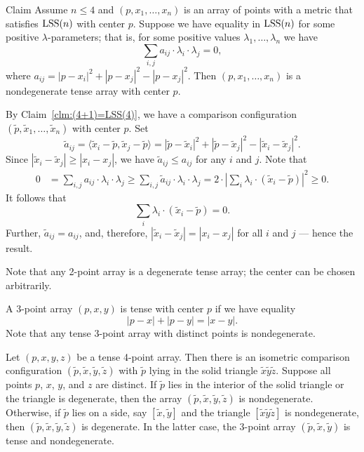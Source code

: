 \documentclass{article}
\begin{document}
\begin{thm}{Claim}\label{clm:nondeg-tense}
Assume $n\le 4$ and $(p,x_1,\dots,x_n)$ is an array of points with a metric that satisfies $\mathrm{LSS}(n)$ with center $p$.
Suppose we have equality in $\mathrm{LSS}(n)$ for some positive $\lambda$-parameters;
that is, for some positive values $\lambda_1,\dots,\lambda_n$ we have
\[\sum_{i,j}a_{ij}\cdot \lambda_i\cdot\lambda_j= 0,\]
where $a_{ij}=|p-x_i|^2+|p-x_j|^2-|p-x_j|^2$.
Then $(p,x_1,\dots,x_n)$ is a nondegenerate tense array with center $p$.
\end{thm}

By Claim~\ref{clm:(4+1)=LSS(4)}, we have a comparison configuration $(\tilde p,\tilde x_1,\dots,\tilde x_n)$ with center $p$.
Set 
\[\tilde a_{ij}
=
\langle\tilde x_i-\tilde p,\tilde x_j-\tilde p\rangle
=
|\tilde p-\tilde x_i|^2+|\tilde p-\tilde x_j|^2-|\tilde x_i-\tilde x_j|^2.\]
Since $|\tilde x_i-\tilde x_j|\ge| x_i- x_j|$, we have $\tilde a_{ij}\le a_{ij}$ for any $i$ and $j$.
Note that 
\begin{align*}
0&=\sum_{i,j}a_{ij}\cdot \lambda_i\cdot\lambda_j\ge
\sum_{i,j}\tilde a_{ij}\cdot \lambda_i\cdot\lambda_j= 
2\cdot\left|\sum_i\lambda_i\cdot (\tilde x_i-\tilde p)\right|^2\ge 
0.
\end{align*}
It follows that 
\[\sum_i\lambda_i\cdot (\tilde x_i-\tilde p)=0.\]
Further, $\tilde a_{ij}= a_{ij}$, and, therefore, $|\tilde x_i-\tilde x_j|=| x_i- x_j|$ for all $i$ and $j$ --- hence the result.
\qeds

Note that any 2-point array is a degenerate tense array; the center can be chosen arbitrarily.

A 3-point array $(p,x,y)$ is tense with center $p$ if we have equality 
\[|p-x|+|p-y|=|x-y|.\]
Note that any tense 3-point array with distinct points is nondegenerate.

Let $(p,x,y,z)$ be a tense 4-point array.
Then there is an isometric comparison configuration $(\tilde p,\tilde x,\tilde y,\tilde z)$ with $\tilde p$ lying in the solid triangle $\tilde x\tilde y\tilde z$.
Suppose all points $p$, $x$, $y$, and $z$ are distinct.
If $\tilde p$ lies in the interior of the solid triangle or the triangle is degenerate, then the array $(\tilde p,\tilde x,\tilde y,\tilde z)$ is nondegenerate.
Otherwise, if $\tilde p$ lies on a side, say $[\tilde x,\tilde y]$ and the triangle $[\tilde x\tilde y\tilde z]$ is nondegenerate, then $(\tilde p,\tilde x,\tilde y,\tilde z)$ is degenerate.
In the latter case, the 3-point array $(\tilde p,\tilde x,\tilde y)$ is tense and nondegenerate.
\end{document}
